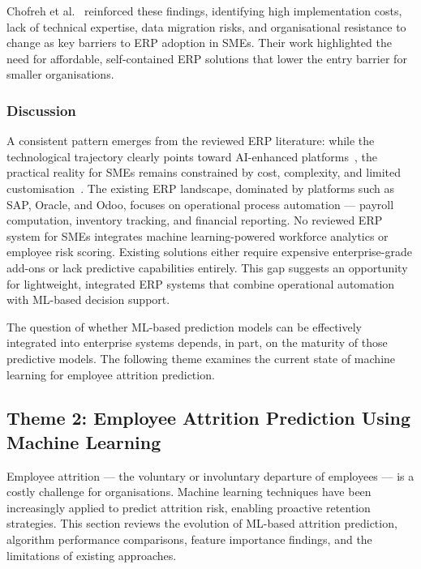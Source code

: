 \documentclass[12pt,a4paper]{article}
\begin{document}
Chofreh et al.~\cite{chofreh2021cloud} reinforced these findings, identifying high implementation costs, lack of technical expertise, data migration risks, and organisational resistance to change as key barriers to ERP adoption in SMEs. Their work highlighted the need for affordable, self-contained ERP solutions that lower the entry barrier for smaller organisations.

\subsubsection{Discussion}

A consistent pattern emerges from the reviewed ERP literature: while the technological trajectory clearly points toward AI-enhanced platforms~\cite{katuu2020erp}, the practical reality for SMEs remains constrained by cost, complexity, and limited customisation~\cite{albarghouthi2024cloud, chofreh2021cloud}. The existing ERP landscape, dominated by platforms such as SAP, Oracle, and Odoo, focuses on operational process automation --- payroll computation, inventory tracking, and financial reporting. No reviewed ERP system for SMEs integrates machine learning-powered workforce analytics or employee risk scoring. Existing solutions either require expensive enterprise-grade add-ons or lack predictive capabilities entirely. This gap suggests an opportunity for lightweight, integrated ERP systems that combine operational automation with ML-based decision support.

The question of whether ML-based prediction models can be effectively integrated into enterprise systems depends, in part, on the maturity of those predictive models. The following theme examines the current state of machine learning for employee attrition prediction.

\subsection{Theme 2: Employee Attrition Prediction Using Machine Learning}
\label{sec:theme2}

Employee attrition --- the voluntary or involuntary departure of employees --- is a costly challenge for organisations. Machine learning techniques have been increasingly applied to predict attrition risk, enabling proactive retention strategies. This section reviews the evolution of ML-based attrition prediction, algorithm performance comparisons, feature importance findings, and the limitations of existing approaches.
\end{document}
